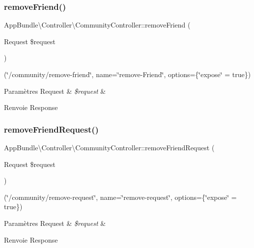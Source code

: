 \subsubsection{\texorpdfstring{remove\+Friend()}{removeFriend()}}
{\footnotesize\ttfamily App\+Bundle\textbackslash{}\+Controller\textbackslash{}\+Community\+Controller\+::remove\+Friend (\begin{DoxyParamCaption}\item[{Request}]{\$request }\end{DoxyParamCaption})}

(\char`\"{}/community/remove-\/friend\char`\"{}, name=\char`\"{}remove-\/\+Friend\char`\"{}, options=\{\char`\"{}expose\char`\"{} = true\}) 
\begin{DoxyParams}[1]{Paramètres}
Request & {\em \$request} & \\
\hline
\end{DoxyParams}
\begin{DoxyReturn}{Renvoie}
Response 
\end{DoxyReturn}
\mbox{\label{classAppBundle_1_1Controller_1_1CommunityController_a4db8318b023676b683c0aec7c5c260ff}} 
\subsubsection{\texorpdfstring{remove\+Friend\+Request()}{removeFriendRequest()}}
{\footnotesize\ttfamily App\+Bundle\textbackslash{}\+Controller\textbackslash{}\+Community\+Controller\+::remove\+Friend\+Request (\begin{DoxyParamCaption}\item[{Request}]{\$request }\end{DoxyParamCaption})}

(\char`\"{}/community/remove-\/request\char`\"{}, name=\char`\"{}remove-\/request\char`\"{}, options=\{\char`\"{}expose\char`\"{} = true\}) 
\begin{DoxyParams}[1]{Paramètres}
Request & {\em \$request} & \\
\hline
\end{DoxyParams}
\begin{DoxyReturn}{Renvoie}
Response 
\end{DoxyReturn}
\mbox{\label{classAppBundle_1_1Controller_1_1CommunityController_a5d054da3bc5bdcbdaf4fe460ee12cb97}} 
